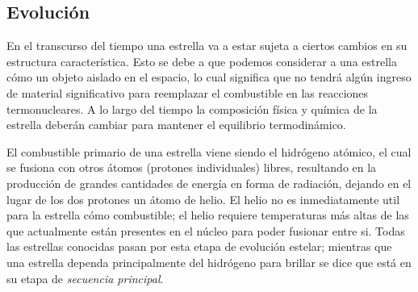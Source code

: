\subsection{Evolución}

En el transcurso del tiempo una estrella va a estar sujeta a ciertos cambios en
su estructura característica. Esto se debe a que podemos considerar a una
estrella cómo un objeto aislado en el espacio, lo cual significa que no tendrá
algún ingreso de material significativo para reemplazar el combustible
 en las reacciones termonucleares. A lo largo del tiempo la
composición física y química de la estrella deberán cambiar para mantener el
equilibrio termodinámico.

El combustible primario de una estrella viene siendo el hidrógeno atómico, el
cual se fusiona con otros átomos (protones individuales) libres, resultando en
la producción de grandes cantidades de energía en forma de radiación, dejando en
el lugar de los dos protones un átomo de helio. El helio no es inmediatamente
util para la estrella cómo combustible; el helio requiere temperaturas más altas
de las que actualmente están presentes en el núcleo para poder fusionar entre
si. Todas las estrellas conocidas pasan por esta etapa de evolución estelar;
mientras que una estrella dependa principalmente del hidrógeno para brillar se
dice que está en su etapa de \textit{secuencia principal}.